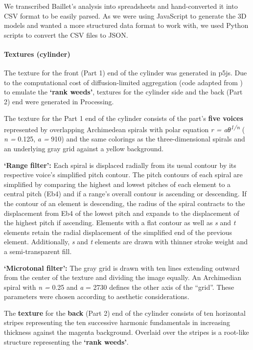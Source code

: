 \documentclass[sigconf]{nimeart}
\begin{document}
We transcribed Baillet's analysis into spreadsheets and hand-converted it into CSV format to be easily parsed. As we were using JavaScript to generate the 3D models and wanted a more structured data format to work with, we used Python scripts to convert the CSV files to JSON.

\paragraph{Textures (cylinder)}\label{textures-cylinder}

The texture for the front (Part 1) end of the cylinder was generated in p5js. Due to the computational cost of diffusion-limited aggregation (code adapted from \cite{c29}) to emulate the \textbf{`rank weeds'}, textures for the cylinder side and the back (Part 2) end were generated in Processing.

The texture for the Part 1 end of the cylinder consists of the part's \textbf{five voices} represented by overlapping Archimedean spirals\cite{c30} with polar equation \emph{r = aθ}\textsuperscript{\emph{1/n}} \emph{} ( \emph{n =} 0.125, \emph{a =} 910) and the same colorings as the three-dimensional spirals and an underlying gray grid against a yellow background.

\textbf{`Range filter':} Each spiral is displaced radially from its usual contour by its respective voice's simplified pitch contour. The pitch contours of each spiral are simplified by comparing the highest and lowest pitches of each element to a central pitch (Eb4) and if a range's overall contour is ascending or descending. If the contour of an element is descending, the radius of the spiral contracts to the displacement from Eb4 of the lowest pitch and expands to the displacement of the highest pitch if ascending. Elements with a flat contour as well as \emph{s} and \emph{t} elements retain the radial displacement of the simplified end of the previous element. Additionally, \emph{s} and \emph{t} elements are drawn with thinner stroke weight and a semi-transparent fill.

\textbf{`Microtonal filter':} The gray grid is drawn with ten lines extending outward from the center of the texture and dividing the image equally. An Archimedian spiral with \emph{n =} 0.25 and \emph{a} = 2730 defines the other axis of the ``grid''. These parameters were chosen according to aesthetic considerations.

The \textbf{texture} for the \textbf{back} (Part 2) end of the cylinder consists of ten horizontal stripes representing the ten successive harmonic fundamentals in increasing thickness against the magenta background. Overlaid over the stripes is a root-like structure representing the \textbf{`rank weeds'}.
\end{document}
